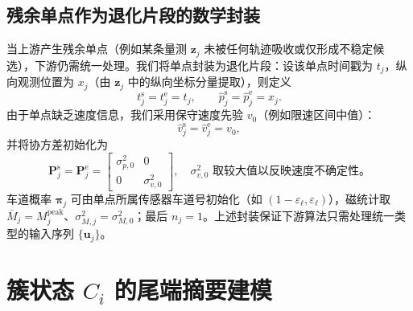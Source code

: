 \documentclass{xdupgthesis}
\begin{document}
\subsection{残余单点作为退化片段的数学封装}
\label{sec:degenerate_frag_zh}
当上游产生残余单点（例如某条量测 $\mathbf{z}_j$ 未被任何轨迹吸收或仅形成不稳定候选），下游仍需统一处理。我们将单点封装为退化片段：设该单点时间戳为 $t_j$，纵向观测位置为 $x_j$（由 $\mathbf{z}_j$ 中的纵向坐标分量提取），则定义
\begin{equation}
	t_j^{\mathrm{s}} = t_j^{\mathrm{e}} = t_j,\qquad
	\hat p_j^{\mathrm{s}} = \hat p_j^{\mathrm{e}} = x_j.
	\tag{4-2}
\end{equation}
由于单点缺乏速度信息，我们采用保守速度先验 $v_0$（例如限速区间中值）：
\begin{equation}
	\hat v_j^{\mathrm{s}} = \hat v_j^{\mathrm{e}} = v_0,
	\tag{4-3}
\end{equation}
并将协方差初始化为
\begin{equation}
	\mathbf{P}_j^{\mathrm{s}}=\mathbf{P}_j^{\mathrm{e}}=
	\begin{bmatrix}
		\sigma_{p,0}^2 & 0\\
		0 & \sigma_{v,0}^2
	\end{bmatrix},\quad
	\sigma_{v,0}^2 \text{ 取较大值以反映速度不确定性。}
	\tag{4-4}
\end{equation}
车道概率 $\boldsymbol{\pi}_j$ 可由单点所属传感器车道号初始化（如 $(1-\varepsilon_\ell,\varepsilon_\ell)$），磁统计取 $\bar M_j=M_j^{\mathrm{peak}}$、$\sigma_{M,j}^2=\sigma_{M,0}^2$；最后 $n_j=1$。上述封装保证下游算法只需处理统一类型的输入序列 $\{\mathbf{u}_j\}$。

\section{簇状态 $C_i$ 的尾端摘要建模}
\end{document}
